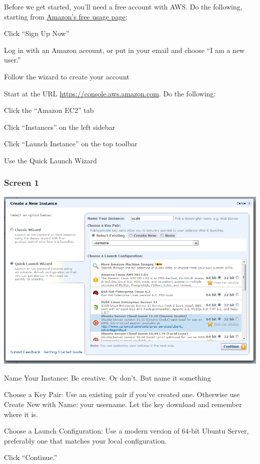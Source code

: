 \documentclass{article}
\begin{document}

Before we get started, you'll need a free account with AWS. Do the following, starting from \href{http://aws.amazon.com/free/}{Amazon's free usage page}:

\begin{enumerate*}
\item Click ``Sign Up Now''
\item Log in with an Amazon account, or put in your email and choose ``I am a new user.''
\item Follow the wizard to create your account
\end{enumerate*}


Start at the URL \href{https://console.aws.amazon.com}{https://console.aws.amazon.com}. Do the following:

\begin{enumerate*}
\item Click the ``Amazon EC2'' tab
\item Click ``Instances'' on the left sidebar
\item Click ``Launch Instance'' on the top toolbar
\item Use the Quick Launch Wizard
\end{enumerate*}

\subsubsection*{Screen 1}

\includegraphics[width=6in]{screen1}

\begin{enumerate*}
\item Name Your Instance: Be creative. Or don't. But name it something
\item Choose a Key Pair: Use an existing pair if you've created one. Otherwise use Create New with Name: your username. Let the key download and remember where it is.
\item Choose a Launch Configuration: Use a modern version of 64-bit Ubuntu Server, preferably one that matches your local configuration.
\item Click ``Continue.''
\end{enumerate*}
\end{document}
